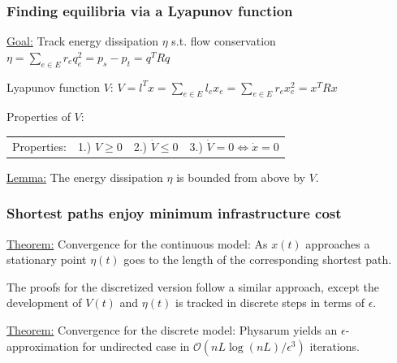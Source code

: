 \documentclass[	hyperref={pdfpagelabels=false}, xcolor=dvipsnames,
		11pt]{beamer}
\begin{document}
\begin{frame}
    \frametitle{ Finding equilibria via a Lyapunov function } 

	
	\begin{alertblock}{\underline{Goal:} Track energy dissipation $\eta$ s.t. flow conservation}
	 \center
	  $\eta =  \sum\limits_{e  \in E} r_e q_e^2 = p_s - p_t = q^T R q$ 

	\end{alertblock}



	\begin{block}{Lyapunov function $V$:}
	  \center
	  $V = l^{T} x = \sum\limits_{e  \in E} l_e x_e = \sum\limits_{e  \in E} r_e x_e^2 = x^T R x$ 
	 
	\end{block}

	\begin{block}{Properties of $V$:}
	  \center
	 \begin{tabular}{llll}
	   Properties:		& 1.) $V \ge 0$ & 2.) $\dot V \le 0$ & 3.) $\dot V = 0 \iff \dot x = 0$ 
	  \end{tabular}
	 
	\end{block}
	

	
	  

	\begin{alertblock}{\underline{Lemma:} }
	The energy dissipation $\eta$ is bounded from above by $V$.
	\end{alertblock}



	

\end{frame}





\begin{frame}
    \frametitle{Shortest paths enjoy minimum infrastructure cost} 

	\begin{alertblock}{\underline{Theorem:} Convergence for the continuous model:}
	  As $x(t)$ approaches a stationary point $\eta(t)$ goes to the length of the corresponding shortest path.
	\end{alertblock}

	The proofs for the discretized version follow a similar approach, except the development of $V(t)$ and $\eta(t)$ is tracked in discrete 
        steps in terms of $\epsilon$.

	\begin{alertblock}{\underline{Theorem:} Convergence for the discrete model:}
	    Physarum yields an $\epsilon$-approximation for undirected case in $\mathcal{O}( nL \log(nL) / \epsilon^3)$ iterations.
	\end{alertblock}


	

\end{frame}
\end{document}
